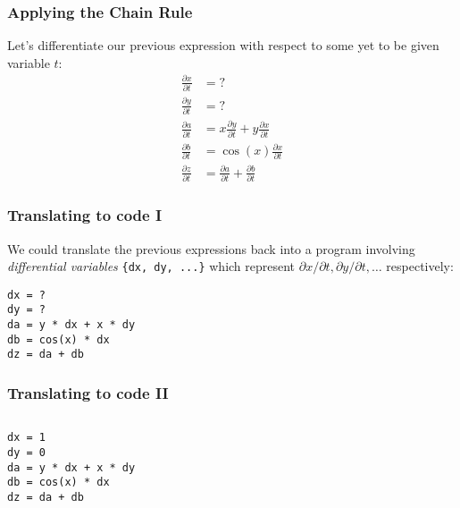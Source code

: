\documentclass{beamer}
\begin{document}
\begin{frame}
\frametitle{Applying the Chain Rule}
Let's differentiate our previous expression with respect to some yet to be given variable $t$:
\begin{align*}
	\frac{\partial x}{\partial t} & = ? \\
	\frac{\partial y}{\partial t} & = ? \\
	\frac{\partial a}{\partial t} & = x \frac{\partial y}{\partial t} + y \frac{\partial x}{\partial t}\\
	\frac{\partial b}{\partial t} & = \cos(x) \frac{\partial x}{\partial t}\\
	\frac{\partial z}{\partial t} & = \frac{\partial a}{\partial t} + \frac{\partial b}{\partial t}
\end{align*}


\end{frame}

\begin{frame}[fragile]
\frametitle{Translating to code I}
We could translate the previous expressions back into a program involving \emph{differential variables} \lstinline!{dx, dy, ...}! which represent $\partial x/\partial t, \partial y/\partial t, \dots$ respectively:

\begin{lstlisting}
dx = ?
dy = ?
da = y * dx + x * dy
db = cos(x) * dx
dz = da + db	
\end{lstlisting}

\end{frame}

\begin{frame}[fragile]
\frametitle{Translating to code II}

\begin{columns}
\begin{lstlisting}
dx = 1
dy = 0
da = y * dx + x * dy
db = cos(x) * dx
dz = da + db	
\end{lstlisting}


\end{columns}
\end{frame}
\end{document}

